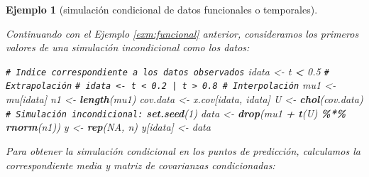 \documentclass[
  spanish,
  10pt,
]{book}
\newenvironment{Shaded}{\begin{snugshade}}{\end{snugshade}}
\newcommand{\CommentTok}[1]{\textcolor[rgb]{0.56,0.35,0.01}{\textit{#1}}}
\newcommand{\ConstantTok}[1]{\textcolor[rgb]{0.56,0.35,0.01}{#1}}
\newcommand{\DecValTok}[1]{\textcolor[rgb]{0.00,0.00,0.81}{#1}}
\newcommand{\FloatTok}[1]{\textcolor[rgb]{0.00,0.00,0.81}{#1}}
\newcommand{\FunctionTok}[1]{\textcolor[rgb]{0.13,0.29,0.53}{\textbf{#1}}}
\newcommand{\NormalTok}[1]{#1}
\newcommand{\OtherTok}[1]{\textcolor[rgb]{0.56,0.35,0.01}{#1}}
\newcommand{\SpecialCharTok}[1]{\textcolor[rgb]{0.81,0.36,0.00}{\textbf{#1}}}
\theoremstyle{break}
\newtheorem{example}{Ejemplo}[chapter]
\theoremstyle{nonumberplain}
\renewcommand{\CommentTok}[1]{\textcolor[rgb]{0.41,0.41,0.41}{\texttt{#1}}}
\begin{document}
\begin{example}[simulación condicional de datos funcionales o temporales]
\protect\hypertarget{exm:funcionalcond}{}\label{exm:funcionalcond}

Continuando con el Ejemplo \ref{exm:funcional} anterior, consideramos los primeros
valores de una simulación incondicional como los datos:

\begin{Shaded}
\begin{Highlighting}[]
\CommentTok{\# Indice correspondiente a los datos observados}
\NormalTok{idata }\OtherTok{\textless{}{-}}\NormalTok{ t }\SpecialCharTok{\textless{}} \FloatTok{0.5} \CommentTok{\# Extrapolación}
\CommentTok{\# idata \textless{}{-} t \textless{} 0.2 | t \textgreater{} 0.8 \# Interpolación}
\NormalTok{mu1 }\OtherTok{\textless{}{-}}\NormalTok{ mu[idata]}
\NormalTok{n1 }\OtherTok{\textless{}{-}} \FunctionTok{length}\NormalTok{(mu1)}
\NormalTok{cov.data }\OtherTok{\textless{}{-}}\NormalTok{ x.cov[idata, idata]}
\NormalTok{U }\OtherTok{\textless{}{-}} \FunctionTok{chol}\NormalTok{(cov.data)}
\CommentTok{\# Simulación incondicional:}
\FunctionTok{set.seed}\NormalTok{(}\DecValTok{1}\NormalTok{)}
\NormalTok{data }\OtherTok{\textless{}{-}} \FunctionTok{drop}\NormalTok{(mu1 }\SpecialCharTok{+} \FunctionTok{t}\NormalTok{(U) }\SpecialCharTok{\%*\%} \FunctionTok{rnorm}\NormalTok{(n1))}
\NormalTok{y }\OtherTok{\textless{}{-}} \FunctionTok{rep}\NormalTok{(}\ConstantTok{NA}\NormalTok{, n)}
\NormalTok{y[idata] }\OtherTok{\textless{}{-}}\NormalTok{ data}
\end{Highlighting}
\end{Shaded}

Para obtener la simulación condicional en los puntos de predicción, calculamos la correspondiente media y matriz de covarianzas condicionadas:


\end{example}
\end{document}
